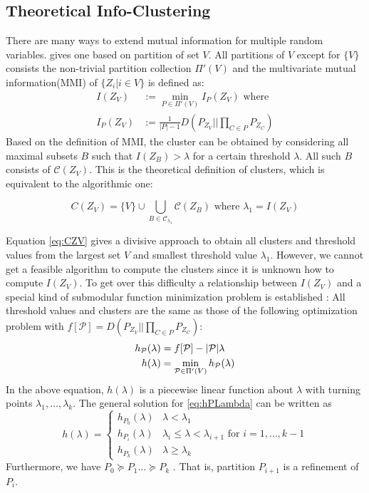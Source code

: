 \subsection{Theoretical Info-Clustering}
There are many ways to extend mutual information for multiple random variables. \cite{ic2016} gives one based on partition of set $V$. All partitions of $V$ except for $\{V\}$ consists the non-trivial partition collection $\Pi'(V)$ and the multivariate mutual information(MMI) of $\{Z_i | i \in V\}$ is defined as:
\begin{align}\label{eq:IZV}
I(Z_V) &:= \min_{P \in \Pi'(V)} I_{P}(Z_V) \textrm{ where} \\
I_P(Z_V) &:= \frac{1}{|P| - 1}D(P_{Z_V} || \prod_{C\in P} P_{Z_C})
\end{align}
Based on the definition of MMI, the cluster can be obtained by considering all maximal subsets $B$ such that $I(Z_B) > \lambda$ for a certain threshold $\lambda$. All such $B$ consists of $\mathcal{C}(Z_V)$.
This is the theoretical definition of clusters, which is equivalent to the algorithmic one:

\begin{equation}\label{eq:CZV}
C(Z_V) = \{ V\} \cup \bigcup_{B \in \mathcal{C}_{\lambda_1}} \mathcal{C}(Z_B) \textrm{ where } \lambda_1 = I(Z_V)
\end{equation}

Equation \eqref{eq:CZV} gives a divisive approach to obtain all clusters and threshold values from
the largest set $V$ and smallest threshold value $\lambda_1$. However, we cannot get a feasible algorithm
to compute the clusters since it is unknown how to compute $I(Z_V)$.
To get over this difficulty a relationship between $I(Z_V)$ and a special kind of submodular function minimization problem is established \citep{mac}: All threshold values and clusters are the same as those of
the following optimization problem with $f[\mathcal{P}]=D(P_{Z_V} || \prod_{C\in P}P_{Z_C})$:
\begin{align}\label{eq:hPLambda}
h_{\mathcal{P}}(\lambda) &= f[\mathcal{P}] - |\mathcal{P}| \lambda \notag\\
h(\lambda) &= \min_{\mathcal{P} \in \Pi'(V)}h_{\mathcal{P}}(\lambda)
\end{align}
In the above equation, $h(\lambda)$ is a piecewise linear function about $\lambda$ with turning points
$\lambda_1, \dots, \lambda_{k}$. The general solution for \eqref{eq:hPLambda} can be written as
\begin{equation}\label{eq:PSP_structure}
h(\lambda) = \begin{cases} h_{P_0}(\lambda) & \lambda < \lambda_1 \\
h_{P_i}(\lambda) & \lambda_i \leq \lambda < \lambda_{i+1} \textrm{ for } i = 1, \dots, k-1 \\
h_{P_k}(\lambda) & \lambda \geq \lambda_k
\end{cases}
\end{equation}
Furthermore, we have $P_0 \succeq P_1 \dots \succeq P_k$ \citep{narayanan}. That is, partition $P_{i+1}$ is a refinement of $P_i$.

